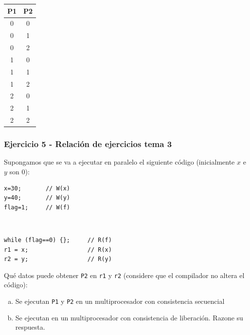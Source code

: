 \documentclass[10pt,a4paper,spanish]{report}
\begin{document}
\begin{enumerate}[a)]
    \begin{center}
    \begin{tabular}{c|c}
    P1 & P2 \\
    \hline
    0 & 0 \\
    0 & 1 \\
    0 & 2 \\
    1 & 0 \\
    1 & 1 \\
    1 & 2 \\
    2 & 0 \\
    2 & 1 \\
    2 & 2 \\
    \end{tabular}
    \end{center}

\end{enumerate}

\textcolor[rgb]{0.2,0.4,0.8}{\subsubsection{Ejercicio 5 - Relación de ejercicios tema 3}}
Supongamos que se va a ejecutar en paralelo el siguiente código (inicialmente $x$ e $y$ son $0$):

\begin{center}
\begin{minipage}{0.3\textwidth}
\begin{verbatim}
x=30;       // W(x)
y=40;       // W(y)
flag=1;     // W(f)
\end{verbatim}
\end{minipage}
\begin{minipage}{0.2\textwidth}
\textcolor{White}{.}
\end{minipage}
\begin{minipage}{0.4\textwidth}
\begin{verbatim}
while (flag==0) {};     // R(f)
r1 = x;                 // R(x)
r2 = y;                 // R(y)
\end{verbatim}
\end{minipage}
\end{center}

Qué datos puede obtener \verb*|P2| en \verb*|r1| y \verb*|r2| (considere que el compilador no altera el código):
\begin{enumerate}[a)]
    \item Se ejecutan \verb*|P1| y \verb*|P2| en un multiprocesador con consistencia secuencial
    \item Se ejecutan en un multiprocesador con consistencia de liberación. Razone su respuesta.
\end{enumerate}
\end{document}
